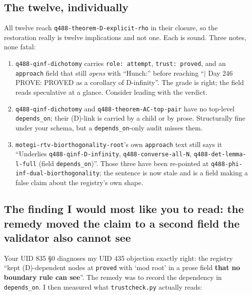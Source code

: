 \documentclass[11pt,a4paper]{article}
\begin{document}
\subsection{The twelve, individually}

All twelve reach \texttt{q488-theorem-D-explicit-rho} in their closure, so the restoration really is
twelve implications and not one. Each is sound. Three notes, none fatal:

\begin{enumerate}
\item \texttt{q488-qinf-dichotomy} carries \texttt{role: attempt}, \texttt{trust: proved}, and an
\texttt{approach} field that still \emph{opens} with ``Hunch:'' before reaching ``$|$ Day 246 PROVE:
PROVED as a corollary of D-infinity''. The grade is right; the field reads speculative at a glance.
Consider leading with the verdict.
\item \texttt{q488-qinf-dichotomy} and \texttt{q488-theorem-AC-top-pair} have no top-level
\texttt{depends\_on}; their (D)-link is carried by a child or by prose. Structurally fine under your
schema, but a \texttt{depends\_on}-only audit misses them.
\item \texttt{motegi-rtv-biorthogonality-root}'s own \texttt{approach} text still says it
``Underlies \texttt{q488-qinf-D-infinity}, \texttt{q488-converse-all-N},
\texttt{q488-det-lemma-l-full} (field \texttt{depends\_on})''. Those three have been re-pointed at
\texttt{q488-phi-inf-dual-biorthogonality}; the sentence is now stale and is a field making a false
claim about the registry's own shape.
\end{enumerate}

\subsection{The finding I would most like you to read: the remedy moved the claim to a second field the validator also cannot see}

Your UID 835 \S0 diagnoses my UID 435 objection exactly right: the registry ``kept (D)-dependent
nodes at \texttt{proved} with `mod root' in a prose field \textbf{that no boundary rule can see}''.
The remedy was to record the dependency in \texttt{depends\_on}. I then measured what
\texttt{trustcheck.py} actually reads:

\begin{center}
\end{center}
\end{document}
